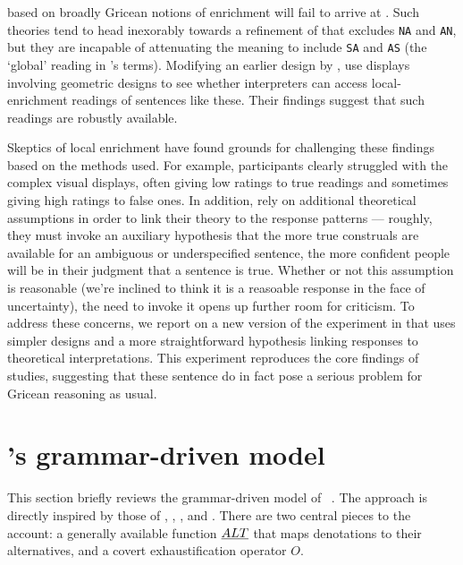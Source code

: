 \documentclass{article}
\begin{document}
based on broadly Gricean notions of enrichment will fail to arrive at
. Such theories tend to head
inexorably towards a refinement of 
that excludes \texttt{NA} and \texttt{AN}, but they are incapable of
attenuating the meaning to include \texttt{SA} and \texttt{AS} (the
`global' reading in \citeauthor{Chemla:Spector:2011}'s terms).
Modifying an earlier design by \citet{Geurts:Pouscoulous:2009},
\citeauthor{Chemla:Spector:2011} use displays involving geometric
designs to see whether interpreters can access local-enrichment
readings of sentences like these. Their findings suggest that such
readings are robustly available. 

Skeptics of local enrichment have found grounds for challenging these
findings based on the methods used. For example, participants clearly
struggled with the complex visual displays, often giving low ratings
to true readings and sometimes giving high ratings to false ones. In
addition, \citeauthor{Chemla:Spector:2011} rely on additional
theoretical assumptions in order to link their theory to the response
patterns --- roughly, they must invoke an auxiliary hypothesis that
the more true construals are available for an ambiguous or
underspecified sentence, the more confident people will be in their
judgment that a sentence is true. Whether or not this assumption is
reasonable (we're inclined to think it is a reasoable response in the
face of uncertainty), the need to invoke it opens up further room for
criticism. To address these concerns, we report on a new version of
the experiment in  that uses simpler designs
and a more straightforward hypothesis linking responses to theoretical
interpretations. This experiment reproduces the core findings of
\citeauthor{Chemla:Spector:2011} studies, suggesting that these
sentence do in fact pose a serious problem for Gricean reasoning as
usual.


\section{\CFS's grammar-driven model}\label{sec:grammar}

This section briefly reviews the grammar-driven model of \CFS\
\citep{ChierchiaFoxSpector08}.  The approach is directly inspired by
those of \citet{Chierchia01}, \citet{Sauerland01},
\citet{Spector:2007}, and \citet{Fox:2007,Fox:2009}. There are two
central pieces to the account: a generally available function $\emph{ALT}$
that maps denotations to their alternatives, and a covert
exhaustification operator $O$.
\end{document}

